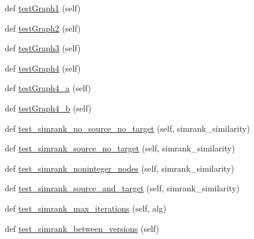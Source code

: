 \begin{DoxyCompactItemize}
\item 
def \hyperlink{classnetworkx_1_1algorithms_1_1tests_1_1test__similarity_1_1TestSimilarity_a2a09b5a450eb172f166091f3624f3a96}{test\+Graph1} (self)
\item 
def \hyperlink{classnetworkx_1_1algorithms_1_1tests_1_1test__similarity_1_1TestSimilarity_a0aab6ba5e9b25c181647b74c19a05e0b}{test\+Graph2} (self)
\item 
def \hyperlink{classnetworkx_1_1algorithms_1_1tests_1_1test__similarity_1_1TestSimilarity_a8a656f7e97b73f0b3779b44bf46edd96}{test\+Graph3} (self)
\item 
def \hyperlink{classnetworkx_1_1algorithms_1_1tests_1_1test__similarity_1_1TestSimilarity_a70e0e654b87cdffd49dddd559bdc700b}{test\+Graph4} (self)
\item 
def \hyperlink{classnetworkx_1_1algorithms_1_1tests_1_1test__similarity_1_1TestSimilarity_a7c580530603e7467b2ba9d780b146ec6}{test\+Graph4\+\_\+a} (self)
\item 
def \hyperlink{classnetworkx_1_1algorithms_1_1tests_1_1test__similarity_1_1TestSimilarity_a309b5a08b6c769847a4f48ed8aec8f59}{test\+Graph4\+\_\+b} (self)
\item 
def \hyperlink{classnetworkx_1_1algorithms_1_1tests_1_1test__similarity_1_1TestSimilarity_a073ee996162e24713bfc71ca1d5d9ad2}{test\+\_\+simrank\+\_\+no\+\_\+source\+\_\+no\+\_\+target} (self, simrank\+\_\+similarity)
\item 
def \hyperlink{classnetworkx_1_1algorithms_1_1tests_1_1test__similarity_1_1TestSimilarity_ab5cea372d7694e9a0c9980177414e29e}{test\+\_\+simrank\+\_\+source\+\_\+no\+\_\+target} (self, simrank\+\_\+similarity)
\item 
def \hyperlink{classnetworkx_1_1algorithms_1_1tests_1_1test__similarity_1_1TestSimilarity_af1415ad61aa980ba991ee41e97c10996}{test\+\_\+simrank\+\_\+noninteger\+\_\+nodes} (self, simrank\+\_\+similarity)
\item 
def \hyperlink{classnetworkx_1_1algorithms_1_1tests_1_1test__similarity_1_1TestSimilarity_afc9e50470f17b16793b342c2bfc9b9ab}{test\+\_\+simrank\+\_\+source\+\_\+and\+\_\+target} (self, simrank\+\_\+similarity)
\item 
def \hyperlink{classnetworkx_1_1algorithms_1_1tests_1_1test__similarity_1_1TestSimilarity_adb3c443498b1c1d8374c1b4a787dd9a0}{test\+\_\+simrank\+\_\+max\+\_\+iterations} (self, alg)
\item 
def \hyperlink{classnetworkx_1_1algorithms_1_1tests_1_1test__similarity_1_1TestSimilarity_a88c0e9a4c43bcc6848dae20836d83e47}{test\+\_\+simrank\+\_\+between\+\_\+versions} (self)

\end{DoxyCompactItemize}
